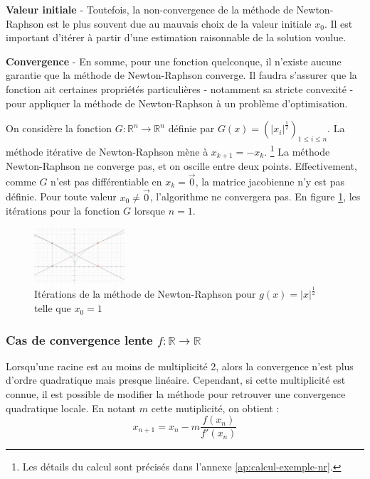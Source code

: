 \documentclass[3p, twocolumn]{elsarticle}
\begin{document}
\textbf{Valeur initiale} - Toutefois, la non-convergence de la méthode de Newton-Raphson est le plus souvent due au mauvais choix de la valeur initiale $x_{0}$. Il est important d'itérer à partir d'une estimation raisonnable de la solution voulue.

\textbf{Convergence} - En somme, pour une fonction quelconque, il n'existe aucune garantie que la méthode de Newton-Raphson converge. Il faudra s'assurer que la fonction ait certaines propriétés particulières - notamment sa stricte convexité - pour appliquer la méthode de Newton-Raphson à un problème d'optimisation.

\begin{exemple}
    On considère la fonction $G:\mathbb R^n\rightarrow \mathbb R^n$ définie par $G(x)=\left(\lvert x_i\rvert^{\frac12}\right)_{1\leq i\leq n}$. La méthode itérative de Newton-Raphson mène à $x_{k+1}=-x_k$. \footnote{Les détails du calcul sont précisés dans l'annexe \ref{ap:calcul-exemple-nr}.}
    \label{ex:newton-raphson-non-differentiable}
    La méthode Newton-Raphson ne converge pas, et on oscille entre deux points. Effectivement, comme $G$ n'est pas différentiable en $x_k=\overrightarrow 0$, la matrice jacobienne n'y est pas définie. Pour toute valeur $x_0\neq \overrightarrow 0$, l'algorithme ne convergera pas. En figure \ref{fig:nr-iterations-2}, les itérations pour la fonction $G$ lorsque $n=1$.
    \begin{figure}[htbp]
        \centering
        \includegraphics[width = 0.3\textwidth]{iteration-newton-2.png}
        \caption{Itérations de la méthode de Newton-Raphson pour $g(x) = \lvert x \rvert ^{\frac12}$ telle que $x_0 = 1$}
        \label{fig:nr-iterations-2}
    \end{figure}
\end{exemple}

\subsubsection{Cas de convergence lente $f:\mathbb{R}\rightarrow \mathbb{R}$}
Lorsqu'une racine est au moins de multiplicité 2, alors la convergence n'est plus d'ordre quadratique mais presque linéaire. Cependant, si cette multiplicité est connue, il est possible de modifier la méthode pour retrouver une convergence quadratique locale. En notant $m$ cette mutiplicité, on obtient :
\begin{equation*}
    x_{n+1}=x_{n}-m\frac{f(x_{n})}{f'(x_{n})}
\end{equation*}
\end{document}
